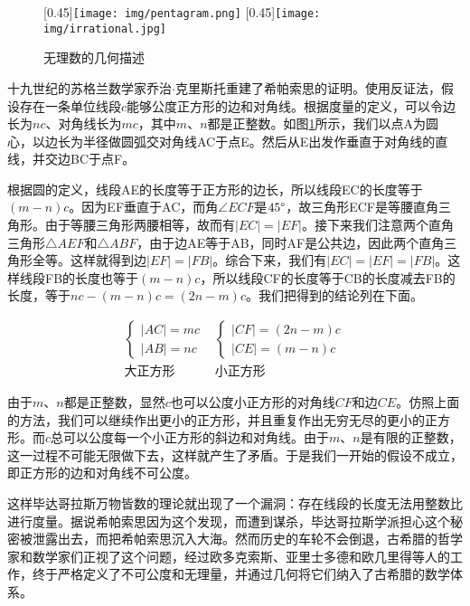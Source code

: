 \documentclass[b5paper]{ctexart}
\begin{document}

\begin{figure}[htbp]
 \centering
 [0.45\linewidth]{\texttt{[image: img/pentagram.png]}}
 [0.45\linewidth]{\texttt{[image: img/irrational.jpg]}}
 \caption{无理数的几何描述}
 \label{fig:pentagram}
 \label{fig:irrational}
\end{figure}

十九世纪的苏格兰数学家乔治$\cdot$克里斯托重建了希帕索思的证明。使用反证法，假设存在一条单位线段$c$能够公度正方形的边和对角线。根据度量的定义，可以令边长为$nc$、对角线长为$mc$，其中$m$、$n$都是正整数。如图\ref{fig:irrational}所示，我们以点A为圆心，以边长为半径做圆弧交对角线AC于点E。然后从E出发作垂直于对角线的直线，并交边BC于点F。

根据圆的定义，线段AE的长度等于正方形的边长，所以线段EC的长度等于$(m - n)c$。因为EF垂直于AC，而角$\angle ECF$是$45\degree$，故三角形ECF是等腰直角三角形。由于等腰三角形两腰相等，故而有$|EC| = |EF|$。接下来我们注意两个直角三角形$\triangle AEF$和$\triangle ABF$，由于边AE等于AB，同时AF是公共边，因此两个直角三角形全等。这样就得到边$|EF| = |FB|$。综合下来，我们有$|EC| = |EF| = |FB|$。这样线段FB的长度也等于$(m - n)c$，所以线段CF的长度等于CB的长度减去FB的长度，等于$nc - (m - n)c = (2n - m)c$。我们把得到的结论列在下面。

\[
\begin{array}{c|c}
\begin{cases}
|AC| = mc \\
|AB| = nc
\end{cases} &
\begin{cases}
|CF| = (2n - m)c \\
|CE| = (m - n)c
\end{cases} \\[4ex]
\text{大正方形} & \text{小正方形}
\end{array}
\]

由于$m$、$n$都是正整数，显然$c$也可以公度小正方形的对角线$CF$和边$CE$。仿照上面的方法，我们可以继续作出更小的正方形，并且重复作出无穷无尽的更小的正方形。而$c$总可以公度每一个小正方形的斜边和对角线。由于$m$、$n$是有限的正整数，这一过程不可能无限做下去，这样就产生了矛盾。于是我们一开始的假设不成立，即正方形的边和对角线不可公度。

这样毕达哥拉斯万物皆数的理论就出现了一个漏洞：存在线段的长度无法用整数比进行度量。据说希帕索思因为这个发现，而遭到谋杀，毕达哥拉斯学派担心这个秘密被泄露出去，而把希帕索思沉入大海。然而历史的车轮不会倒退，古希腊的哲学家和数学家们正视了这个问题，经过欧多克索斯、亚里士多德和欧几里得等人的工作，终于严格定义了不可公度和无理量，并通过几何将它们纳入了古希腊的数学体系。
\end{document}
